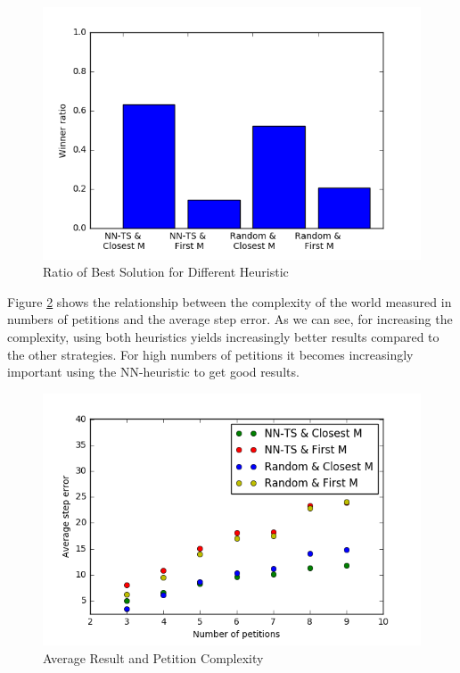 \begin{figure}[!hbt]
  \includegraphics[width=1\textwidth]{img/winner_ratio_vs_heuristic}
  \caption{Ratio of Best Solution for Different Heuristic}
  \label{fig:abc2}
\end{figure}

Figure \ref{fig:abc3} shows the relationship between the complexity of the world measured in numbers of petitions and the average step error. As we can see, for increasing the complexity, using both heuristics yields increasingly better results compared to the other strategies. For high numbers of petitions it becomes increasingly important using the NN-heuristic to get good results.

\begin{figure}[!hbt]
  \includegraphics[width=1\textwidth]{img/avg_error_vs_petitions}
  \caption{Average Result and Petition Complexity}
  \label{fig:abc3}
\end{figure}

